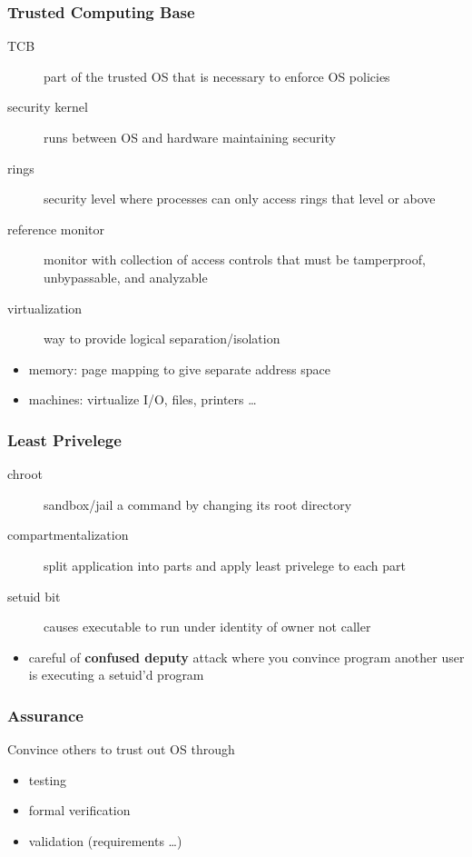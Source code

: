 \documentclass[]{article}
\theoremstyle{definition}
\begin{document}
	\subsubsection{Trusted Computing Base}
	\begin{description}
		\item[TCB] part of the trusted OS that is necessary to enforce OS policies
		\item[security kernel] runs between OS and hardware maintaining security
		\item[rings] security level where processes can only access rings that level or above
		\item[reference monitor] monitor with collection of access controls that must be tamperproof, unbypassable, and analyzable
		\item[virtualization] way to provide logical separation/isolation
	\end{description}
	\begin{itemize}
		\item memory: page mapping to give separate address space
		\item machines: virtualize I/O, files, printers \dots
	\end{itemize}

	\subsubsection{Least Privelege}
	\begin{description}
		\item[chroot] sandbox/jail a command by changing its root directory
		\item[compartmentalization] split application into parts and apply least privelege to each part
		\item[setuid bit] causes executable to run under identity of owner not caller
	\end{description}
	\begin{itemize}
		\item careful of \textbf{confused deputy} attack where you convince program another user is executing a setuid'd program
	\end{itemize}

	\subsubsection{Assurance}
	Convince others to trust out OS through
	\begin{itemize}
		\item testing
		\item formal verification
		\item validation (requirements \dots)
	\end{itemize}
\end{document}
